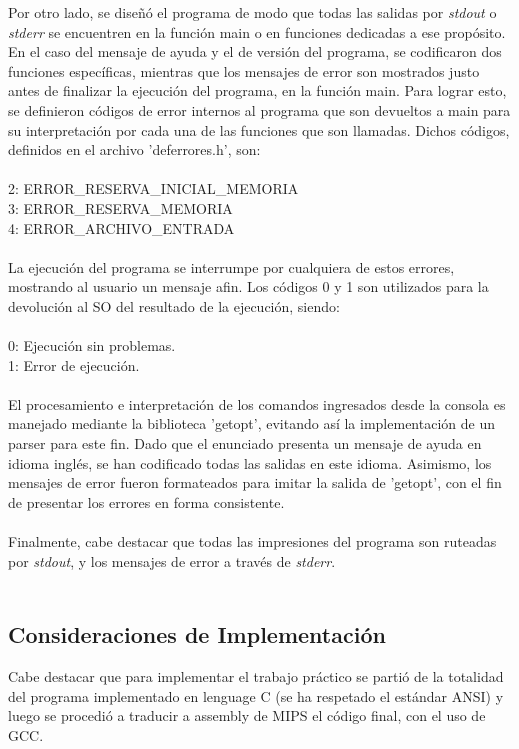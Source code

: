 \documentclass[a4paper,10pt]{article}
\begin{document}
Por otro lado, se dise\~n\'o el programa de modo que todas las salidas por \textit{stdout} o \textit{stderr} se encuentren en la funci\'on main o en funciones dedicadas a ese prop\'osito. En el caso del mensaje de ayuda y el de versi\'on del programa, se codificaron dos funciones espec\'ificas, mientras que los mensajes de error son mostrados justo antes de finalizar la ejecuci\'on del programa, en la funci\'on main. Para lograr esto, se definieron c\'odigos de error internos al programa que son devueltos a main para su interpretaci\'on por cada una de las funciones que son llamadas. Dichos c\'odigos, definidos en el archivo 'deferrores.h', son:\\
\\
2: ERROR\_RESERVA\_INICIAL\_MEMORIA\\
3: ERROR\_RESERVA\_MEMORIA\\
4: ERROR\_ARCHIVO\_ENTRADA\\\\
La ejecuci\'on del programa se interrumpe por cualquiera de estos errores, mostrando al usuario un mensaje afin. Los c\'odigos 0 y 1 son utilizados para la devoluci\'on al SO del resultado de la ejecuci\'on, siendo:\\
\\
0: Ejecuci\'on sin problemas.\\
1: Error de ejecuci\'on.\\
\\
El procesamiento e interpretaci\'on de los comandos ingresados desde la consola es manejado mediante la biblioteca 'getopt', evitando as\'i la implementaci\'on de un parser para este fin. Dado que el enunciado presenta un mensaje de ayuda en idioma ingl\'es, se han codificado todas las salidas en este idioma. Asimismo, los mensajes de error fueron formateados para imitar la salida de 'getopt', con el fin de presentar los errores en forma consistente.\\
\\
Finalmente, cabe destacar que todas las impresiones del programa son ruteadas por \textit{stdout}, y los mensajes de error a trav\'es de \textit{stderr}.\\
\\
\subsection{Consideraciones de Implementaci\'on}

Cabe destacar que para implementar el trabajo pr\'actico se parti\'o de la totalidad del programa implementado en lenguage C (se ha respetado el est\'andar ANSI) y luego se procedi\'o a traducir a assembly de MIPS el c\'odigo final, con el uso de GCC.
\end{document}

